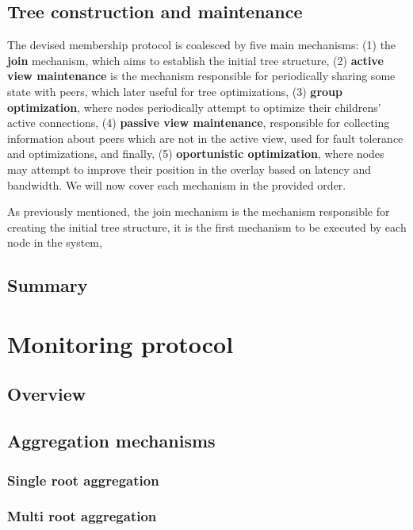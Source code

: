 \subsection{Tree construction and maintenance}

The devised membership protocol is coalesced by five main mechanisms: (1) the \textbf{join} mechanism, which aims to establish the initial tree structure, (2) \textbf{active view maintenance} is the mechanism responsible for periodically sharing some state with peers, which later useful for tree optimizations, (3) \textbf{group optimization}, where nodes periodically attempt to optimize their childrens' active connections, (4) \textbf{passive view maintenance}, responsible for collecting information about peers which are not in the active view, used for fault tolerance and optimizations, and finally, (5) \textbf{oportunistic optimization}, where nodes may attempt to improve their position in the overlay based on latency and bandwidth. We will now cover each mechanism in the provided order.

As previously mentioned, the join mechanism is the mechanism responsible for creating the initial tree structure, it is the first mechanism to be executed by each node in the system, 



\subsection{Summary}

\section{Monitoring protocol}

\subsection{Overview}

\subsection{Aggregation mechanisms}

\subsubsection{Single root aggregation}

\subsubsection{Multi root aggregation}

